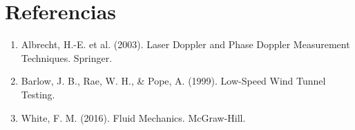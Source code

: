 \documentclass[11pt, a4paper]{article}
\begin{document}
\section{Referencias}
\begin{enumerate}
    \item Albrecht, H.-E. et al. (2003). Laser Doppler and Phase Doppler Measurement Techniques. Springer.
    \item Barlow, J. B., Rae, W. H., \& Pope, A. (1999). Low-Speed Wind Tunnel Testing.
    \item White, F. M. (2016). Fluid Mechanics. McGraw-Hill.
\end{enumerate}
\end{document}
